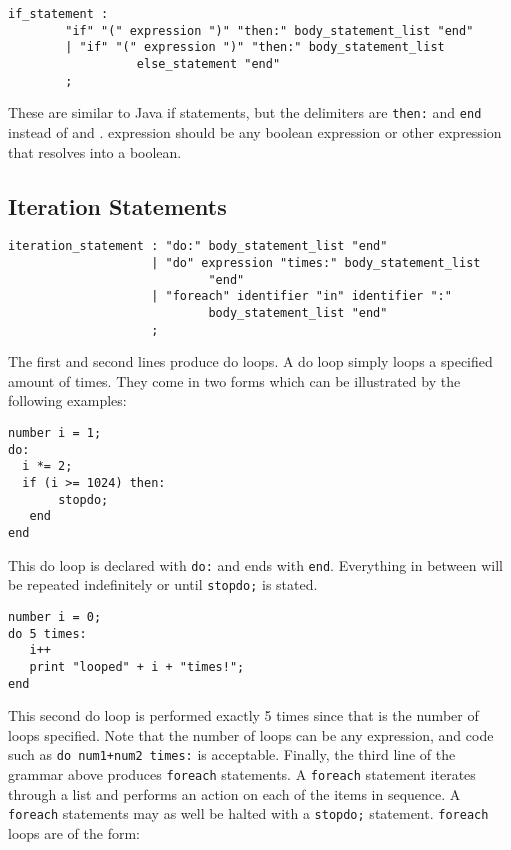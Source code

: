 \begin{verbatim}
if_statement : 
        "if" "(" expression ")" "then:" body_statement_list "end"
        | "if" "(" expression ")" "then:" body_statement_list
                  else_statement "end"
        ;
\end{verbatim}

These are similar to Java if statements, but the delimiters are
\texttt{then:} and \texttt{end} instead of { and }.  expression should
be any boolean expression or other expression that resolves into a
boolean.

\subsection{Iteration Statements}

\begin{verbatim}
iteration_statement : "do:" body_statement_list "end"
                    | "do" expression "times:" body_statement_list
                            "end"
                    | "foreach" identifier "in" identifier ":"
                            body_statement_list "end"
                    ;
\end{verbatim}

The first and second lines produce do loops. A do loop simply loops a
specified amount of times. They 
come in two forms which can be illustrated by the following examples: 

\begin{verbatim}
number i = 1;
do:
  i *= 2;
  if (i >= 1024) then:
       stopdo;
   end
end
\end{verbatim}

This do loop is declared with \texttt{do:} and ends with
\texttt{end}. Everything in between will be repeated indefinitely or
until \texttt{stopdo;} is stated.

\begin{verbatim}
number i = 0;
do 5 times:
   i++
   print "looped" + i + "times!";
end
\end{verbatim}

This second do loop is performed exactly 5 times since that is the
number of loops specified. Note that the number of loops can be any
expression, and code such as \texttt{do num1+num2 times:} is
acceptable.  Finally, the third line of the grammar above produces
\texttt{foreach} statements. A \texttt{foreach} statement iterates
through a list and performs an action on each of the items in
sequence. A \texttt{foreach} statements may as well be halted with a
\texttt{stopdo;} statement. \texttt{foreach} loops are of the form:

